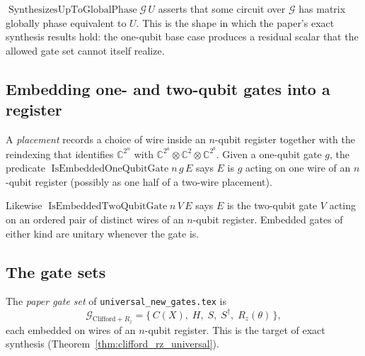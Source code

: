 \begin{definition}
  \label{def:synthesizes_phase}
  \leanok
  $\operatorname{SynthesizesUpToGlobalPhase} \mathcal{G}\, U$ asserts that
  some circuit over $\mathcal{G}$ has matrix globally phase equivalent to $U$.
  This is the shape in which the paper's exact synthesis results hold: the
  one-qubit base case produces a residual scalar that the allowed gate set
  cannot itself realize.
\end{definition}

\subsection{Embedding one- and two-qubit gates into a register}

\begin{definition}
  \label{def:embedded_one}
  \leanok
  A \emph{placement} records a choice of wire inside an $n$-qubit register
  together with the reindexing that identifies
  $\mathbb{C}^{2^n}$ with $\mathbb{C}^{2^a} \otimes \mathbb{C}^{2}
  \otimes \mathbb{C}^{2^b}$.  Given a one-qubit gate $g$, the predicate
  $\operatorname{IsEmbeddedOneQubitGate} n\, g\, E$ says $E$ is $g$ acting on
  one wire of an $n$-qubit register (possibly as one half of a two-wire
  placement).
\end{definition}

\begin{definition}
  \label{def:embedded_two}
  \leanok
  Likewise $\operatorname{IsEmbeddedTwoQubitGate} n\, V\, E$ says $E$ is the
  two-qubit gate $V$ acting on an ordered pair of distinct wires of an
  $n$-qubit register.  Embedded gates of either kind are unitary whenever the
  gate is.
\end{definition}

\subsection{The gate sets}

\begin{definition}
  \label{def:gate_cliffordrz}
  \leanok
  The \emph{paper gate set} of \texttt{universal\_new\_gates.tex} is
  \[
    \mathcal{G}_{\mathrm{Clifford}+R_z}
      = \{\, C(X),\; H,\; S,\; S^\dagger,\; R_z(\theta) \,\},
  \]
  each embedded on wires of an $n$-qubit register.  This is the target of
  exact synthesis (Theorem~\ref{thm:clifford_rz_universal}).
\end{definition}

